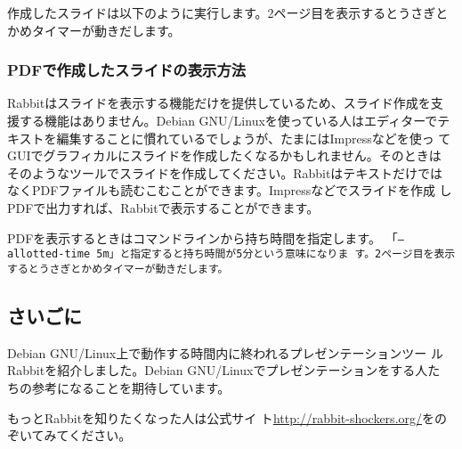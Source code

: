 \documentclass[mingoth,a4paper]{jsarticle}
\begin{document}
作成したスライドは以下のように実行します。2ページ目を表示するとうさぎと
かめタイマーが動きだします。

\begin{commandline}
\end{commandline}

\subsubsection{PDFで作成したスライドの表示方法}

Rabbitはスライドを表示する機能だけを提供しているため、スライド作成を支
援する機能はありません。Debian GNU/Linuxを使っている人はエディターでテ
キストを編集することに慣れているでしょうが、たまにはImpressなどを使っ
てGUIでグラフィカルにスライドを作成したくなるかもしれません。そのときは
そのようなツールでスライドを作成してください。Rabbitはテキストだけでは
なくPDFファイルも読むこむことができます。Impressなどでスライドを作成
しPDFで出力すれば、Rabbitで表示することができます。

PDFを表示するときはコマンドラインから持ち時間を指定します。
「\tt{--allotted-time 5m}」と指定すると持ち時間が5分という意味になりま
す。2ページ目を表示するとうさぎとかめタイマーが動きだします。

\begin{commandline}
\end{commandline}

\subsection{さいごに}

Debian GNU/Linux上で動作する時間内に終われるプレゼンテーションツー
ルRabbitを紹介しました。Debian GNU/Linuxでプレゼンテーションをする人た
ちの参考になることを期待しています。

もっとRabbitを知りたくなった人は公式サイ
ト\url{http://rabbit-shockers.org/}をのぞいてみてください。
\end{document}
